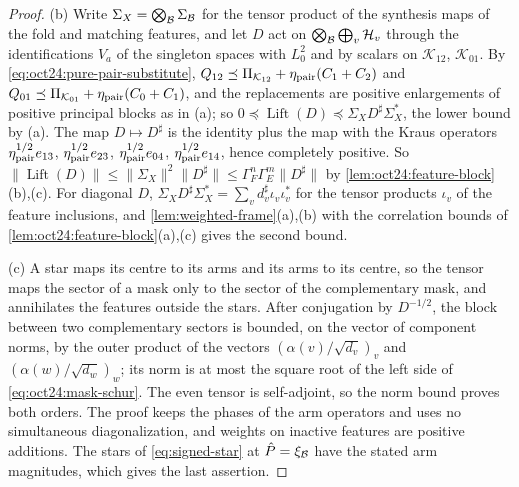 \begin{proof}
(b) Write $\Sigma_X=\bigotimes_\mathcal B\Sigma_\mathcal B$ for the tensor product of the synthesis maps
of the fold and matching features, and let $D$ act on $\bigotimes_\mathcal B\bigoplus_v\mathcal H_v$
through the identifications $V_a$ of the singleton spaces with $L^2_0$ and by scalars
on $\mathcal K_{12}$, $\mathcal K_{01}$. By \eqref{eq:oct24:pure-pair-substitute},
$Q_{12}\preceq\Pi_{\mathcal K_{12}}+\eta_{\rm pair}(C_1+C_2)$ and
$Q_{01}\preceq\Pi_{\mathcal K_{01}}+\eta_{\rm pair}(C_0+C_1)$, and the replacements are positive
enlargements of positive principal blocks as in (a); so
$0\preceq\operatorname{Lift}(D)\preceq\Sigma_XD^\sharp\Sigma_X^*$, the lower bound by (a). The
map $D\mapsto D^\sharp$ is the
identity plus the map with the Kraus operators $\eta_{\rm pair}^{1/2}e_{13}$,
$\eta_{\rm pair}^{1/2}e_{23}$, $\eta_{\rm pair}^{1/2}e_{04}$, $\eta_{\rm pair}^{1/2}e_{14}$, hence
completely positive. So
$\|\operatorname{Lift}(D)\|\le\|\Sigma_X\|^2\|D^\sharp\|\le\Gamma_F^n\Gamma_E^m\|D^\sharp\|$ by
\cref{lem:oct24:feature-block}(b),(c). For diagonal $D$,
$\Sigma_XD^\sharp\Sigma_X^*=\sum_vd^\sharp_v\iota_v\iota_v^*$ for the tensor products $\iota_v$ of the
feature inclusions, and \cref{lem:weighted-frame}(a),(b) with the correlation bounds
of \cref{lem:oct24:feature-block}(a),(c) gives the second bound.

(c) A star maps its centre to its arms and its arms to its centre, so the tensor
maps the sector of a mask only to the sector of the complementary mask, and
annihilates the features outside the stars. After conjugation by $D^{-1/2}$, the
block between two complementary sectors is bounded, on the vector of component
norms, by the outer product of the vectors $(\alpha(v)/\sqrt{d_v})_v$ and
$(\alpha(w)/\sqrt{d_w})_w$; its norm is at most the square root of the left side of
\eqref{eq:oct24:mask-schur}. The even tensor is self-adjoint, so the norm bound
proves both orders. The proof keeps the phases of the arm operators and uses no
simultaneous diagonalization, and weights on inactive features are positive
additions. The stars of \eqref{eq:signed-star} at $\hat P=\xi_\mathcal B$ have the stated arm
magnitudes, which gives the last assertion.


\end{proof}
